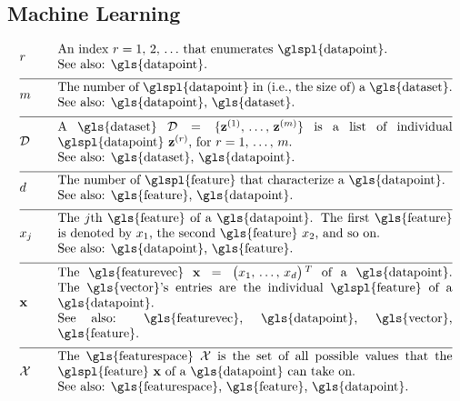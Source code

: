 \newpage
\subsection*{Machine Learning}

\begin{align}
	&\sampleidx &\quad & \parbox{.90\textwidth}{An index $\sampleidx=1, \,2, \,\ldots$ that 
		enumerates \glspl{datapoint}.
		\\ See also: \gls{datapoint}. }   \nonumber \\[2mm] \hline \nonumber\\[-5mm]
	&\samplesize &\quad &\parbox{.90\textwidth}{The number of \glspl{datapoint} in (i.e., the size of) a \gls{dataset}.
		\\ See also: \gls{datapoint}, \gls{dataset}.} \nonumber \\[2mm] \hline \nonumber\\[-5mm] 
	&\dataset &\quad & \parbox{.90\textwidth}{A \gls{dataset} $\dataset = \{ \datapoint^{(1)}, \,\ldots, \,\datapoint^{(\samplesize)} \}$ 
		is a list of individual \glspl{datapoint} $\datapoint^{(\sampleidx)}$, for $\sampleidx=1, \,\ldots, \,\samplesize$.
		\\ See also: \gls{dataset}, \gls{datapoint}.}   \nonumber \\[2mm] \hline \nonumber\\[-5mm]
	&\featurelen &\quad &\parbox{.90\textwidth}{The number of \glspl{feature} that characterize a \gls{datapoint}.
		\\ See also: \gls{feature}, \gls{datapoint}.}\nonumber \\[2mm] \hline \nonumber\\[-5mm]
	&\feature_{\featureidx} &\quad &\parbox{.90\textwidth}{The $\featureidx$th \gls{feature} of a \gls{datapoint}. The first \gls{feature} 
		is denoted by $\feature_{1}$, the second \gls{feature} $\feature_{2}$, and so on.
		\\ See also: \gls{datapoint}, \gls{feature}. } \nonumber \\[2mm] \hline \nonumber\\[-5mm] 
	&\featurevec &\quad &\parbox{.90\textwidth}{The \gls{featurevec} $\featurevec=\big(\feature_{1}, \,\ldots, \,\feature_{\featuredim}\big)\,^{T}$ of 
		a \gls{datapoint}. The \gls{vector}'s entries are the individual \glspl{feature} of a \gls{datapoint}.
		\\ See also: \gls{featurevec}, \gls{datapoint}, \gls{vector}, \gls{feature}. }\nonumber \\[2mm] \hline \nonumber\\[-5mm]
	&\featurespace &\quad & \parbox{.90\textwidth}{The \gls{featurespace} $\featurespace$ is 
		the set of all possible values that the \glspl{feature} $\featurevec$ of a \gls{datapoint} can take on.
		\\ See also: \gls{featurespace}, \gls{feature}, \gls{datapoint}.} \nonumber 
\end{align}        


